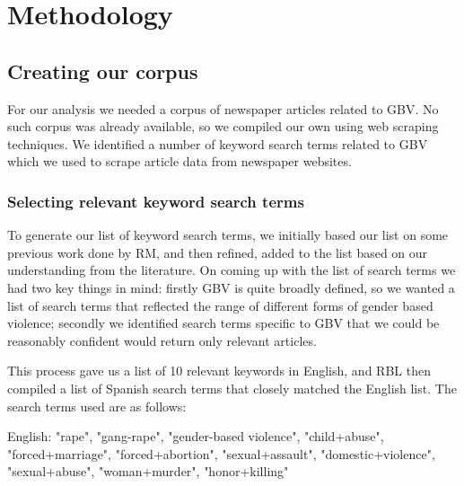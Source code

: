 \documentclass{article}
\begin{document}
\section{Methodology}{
	
\subsection{Creating our corpus}{

For our analysis we needed a corpus of newspaper articles related to GBV. No such corpus was already available, so we compiled our own using web scraping techniques. We identified a number of keyword search terms related to GBV which we used to scrape article data from newspaper websites. 

\subsubsection{Selecting relevant keyword search terms}{
To generate our list of keyword search terms, we initially based our list on some previous work done by RM, and then refined, added to the list based on our understanding from the literature. On coming up with the list of search terms we had two key things in mind: firstly GBV is quite broadly defined, so we wanted a list of search terms that reflected the range of different forms of gender based violence; secondly we identified search terms specific to GBV that we could be reasonably confident would return only relevant articles. 

This process gave us a list of 10 relevant keywords in English, and RBL then compiled a list of Spanish search terms that closely matched the English list. The search terms used are as follows:

English: {"rape", "gang-rape", "gender-based violence", "child+abuse", "forced+marriage", "forced+abortion", "sexual+assault", "domestic+violence", "sexual+abuse", "woman+murder", "honor+killing"}

}}}
\end{document}

